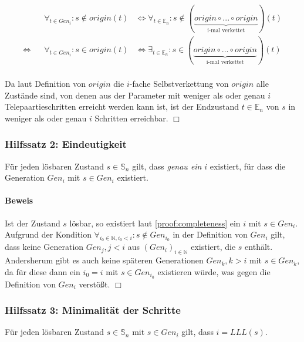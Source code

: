 \documentclass[a4paper,10pt,ngerman]{scrartcl}
\begin{document}
\begin{align*}
    &&\forall_{t \in Gen_i} : s \notin origin(t) 
    &\iff \forall_{t \in \mathbb{E}_n} : s \notin (\underbrace{origin \circ ... \circ origin}_{\text{i-mal verkettet}})(t) \\ 
    \iff&& \forall_{t \in Gen_i} : s \in origin(t) 
    &\iff \exists_{t \in \mathbb{E}_n} : s \in (\underbrace{origin \circ ... \circ origin}_{\text{i-mal verkettet}})(t) \\ 
\end{align*}

Da laut Definition von \(origin\) die \(i\)-fache Selbstverkettung von \(origin\) alle Zustände sind, von denen aus der Parameter mit weniger als oder genau \(i\) Telepaartieschritten erreicht werden kann ist, ist der Endzustand \(t \in \mathbb{E}_n\) von \(s\) in weniger als oder genau \(i\) Schritten erreichbar. \(\Box\)

\subsubsection{Hilfssatz 2: Eindeutigkeit} \label{proof:uniqueness}

Für jeden lösbaren Zustand \(s \in \mathbb{S}_n\) gilt, dass \textit{genau ein} \(i\) existiert, für dass die Generation \(Gen_i\) mit \(s \in Gen_i\) existiert.

\paragraph{Beweis}

Ist der Zustand \(s\) lösbar, so existiert laut \cref{proof:completeness} ein \(i\) mit \(s \in Gen_i\). Aufgrund der Kondition \(\forall_{i_0\in\mathbb{N}, i_0 < i}: s \notin Gen_{i_0}\) in der Definition von \(Gen_i\) gilt, dass keine Generation \(Gen_j, j < i\) aus \((Gen_i)_{i\in\mathbb{N}}\) existiert, die \(s\) enthält. Andersherum gibt es auch keine späteren Generationen \(Gen_k, k > i\) mit \(s \in Gen_k\), da für diese dann ein \(i_0 = i\) mit \(s \in Gen_{i_0}\) existieren würde, was gegen die Definition von \(Gen_i\) verstößt. \(\Box\)

\subsubsection{Hilfssatz 3: Minimalität der Schritte} \label{proof:minimality}

Für jeden lösbaren Zustand \(s \in \mathbb{S}_n\) mit \(s \in Gen_i\) gilt, dass \(i = LLL(s)\).
\end{document}
